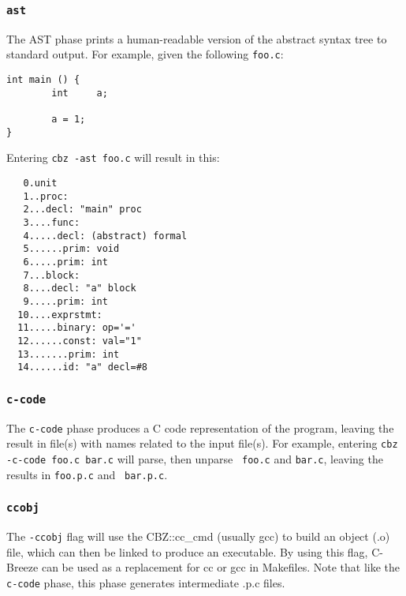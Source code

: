\documentclass[10pt]{article}
\begin{document}
\subsubsection{ {\tt ast}}

The AST phase prints a human-readable version of the abstract syntax tree to
standard output.  For example, given the following {\tt foo.c}:

\begin{small}
\begin{verbatim}
int main () {
        int     a;

        a = 1;
}
\end{verbatim}
\end{small}

Entering {\tt cbz -ast foo.c} will result in this:

\begin{small}
\begin{verbatim}
   0.unit
   1..proc:
   2...decl: "main" proc
   3....func:
   4.....decl: (abstract) formal
   5......prim: void
   6.....prim: int
   7...block:
   8....decl: "a" block
   9.....prim: int
  10....exprstmt:
  11.....binary: op='='
  12......const: val="1"
  13.......prim: int
  14......id: "a" decl=#8
\end{verbatim}
\end{small}

\subsubsection{{\tt c-code}}

The {\tt c-code} phase produces a C code representation of the program,
leaving the result in file(s) with names related to the input file(s).  For
example, entering {\tt cbz -c-code foo.c bar.c} will parse, then unparse {\tt
foo.c} and {\tt bar.c}, leaving the results in {\tt foo.p.c} and {\tt
bar.p.c}.



\subsubsection{{\tt ccobj}}

The {\tt -ccobj} flag will use the CBZ::cc\_cmd (usually gcc) to build an
object (.o) file, which can then be linked to produce an executable.  By
using this flag, C-Breeze can be used as a replacement for cc or gcc in
Makefiles.  Note that like the {\tt c-code} phase, this phase generates
intermediate .p.c files.
\end{document}
